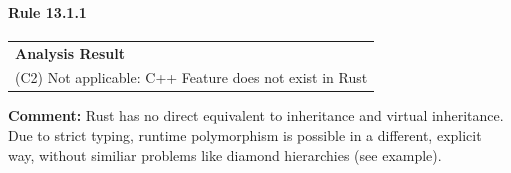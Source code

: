 \paragraph{Rule 13.1.1}
\begin{longtable}{p{13cm}}
\textbf{Analysis Result} \\
(C2) Not applicable: C++ Feature does not exist in Rust \\
\end{longtable}
\textbf{Comment:} Rust has no direct equivalent to inheritance and virtual inheritance. Due to strict typing, runtime polymorphism is possible in a different, explicit way, without similiar problems like diamond hierarchies (see example). \\


